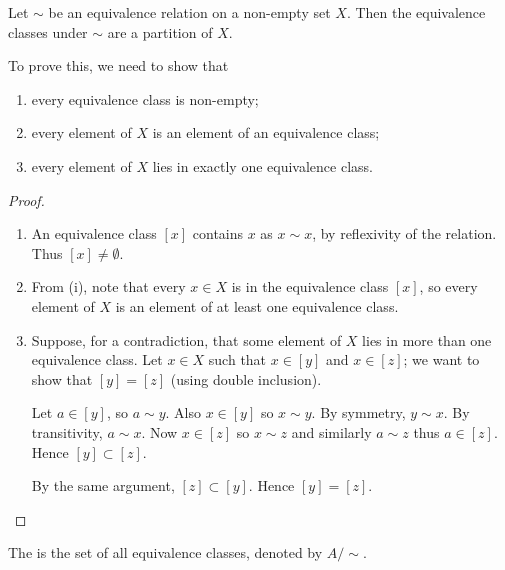 \begin{proposition}
Let $\sim$ be an equivalence relation on a non-empty set $X$. Then the equivalence classes under $\sim$ are a partition of $X$.
\end{proposition}

To prove this, we need to show that
\begin{enumerate}[label=(\roman*)]
\item every equivalence class is non-empty;
\item every element of $X$ is an element of an equivalence class;
\item every element of $X$ lies in exactly one equivalence class.
\end{enumerate}

\begin{proof} \
\begin{enumerate}[label=(\roman*)]
\item An equivalence class $[x]$ contains $x$ as $x\sim x$, by reflexivity of the relation. Thus $[x]\neq\emptyset$.
\item From (i), note that every $x\in X$ is in the equivalence class $[x]$, so every element of $X$ is an element of at least one equivalence class.
\item Suppose, for a contradiction, that some element of $X$ lies in more than one equivalence class. Let $x\in X$ such that $x\in[y]$ and $x\in[z]$; we want to show that $[y]=[z]$ (using double inclusion).

Let $a\in[y]$, so $a\sim y$. Also $x\in[y]$ so $x\sim y$. By symmetry, $y\sim x$. By transitivity, $a\sim x$. Now $x\in[z]$ so $x\sim z$ and similarly $a\sim z$ thus $a\in[z]$. Hence $[y]\subset[z]$.

By the same argument, $[z]\subset[y]$. Hence $[y]=[z]$.
\end{enumerate}
\end{proof}

\begin{definition}
The  is the set of all equivalence classes, denoted by $A/\sim$.
\end{definition}

